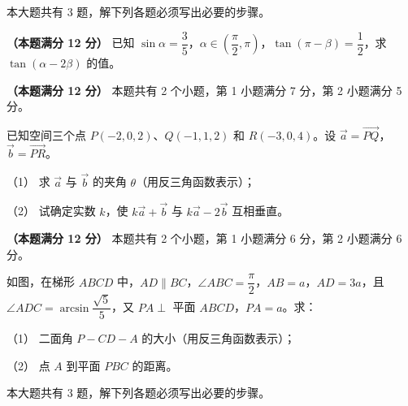 本大题共有 3 题，解下列各题必须写出必要的步骤。

\begin{question}
\textbf{（本题满分 12 分）} 已知 $\sin\alpha=\dfrac35$，$\alpha\in\left(\dfrac\pi2,\pi\right)$，$\tan(\pi-\beta)=\dfrac12$，求 $\tan(\alpha-2\beta)$ 的值。

\end{question}
\begin{question}
\textbf{（本题满分 12 分）} 本题共有 2 个小题，第 1 小题满分 7 分，第 2 小题满分 5 分。

已知空间三个点 $P(-2,0,2)$、$Q(-1,1,2)$ 和 $R(-3,0,4)$。设 $\vec a=\overrightarrow{PQ}$，$\vec b=\overrightarrow{PR}$。

（1） 求 $\vec a$ 与 $\vec b$ 的夹角 $\theta$（用反三角函数表示）；

（2） 试确定实数 $k$，使 $k\vec a+\vec b$ 与 $k\vec a-2\vec b$ 互相垂直。

\Needspace{0.4\textheight}
\end{question}
\begin{question}
\textbf{（本题满分 12 分）} 本题共有 2 个小题，第 1 小题满分 6 分，第 2 小题满分 6 分。

如图，在梯形 $ABCD$ 中，$AD\parallel BC$，$\angle ABC=\dfrac\pi2$，$AB=a$，$AD=3a$，且 $\angle ADC=\arcsin\dfrac{\sqrt5}{5}$，又 $PA\perp$ 平面 $ABCD$，$PA=a$。求：

（1） 二面角 $P-CD-A$ 的大小（用反三角函数表示）；

（2） 点 $A$ 到平面 $PBC$ 的距离。
\nopagebreak[4]
\begin{center}\end{center}
\nopagebreak[4]
\end{question}

本大题共有 3 题，解下列各题必须写出必要的步骤。

